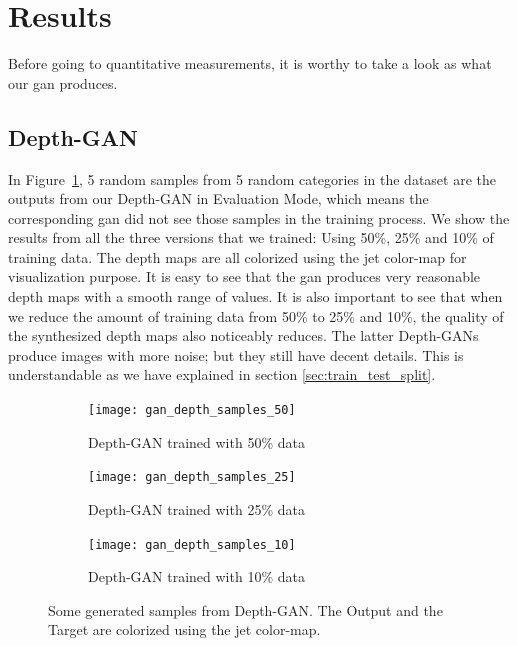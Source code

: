 \section{Results}
\label{sec:results}

Before going to quantitative measurements, it is worthy to take a look as what our
\acrshort{gan} produces. 

\subsection{Depth-GAN}
\label{sub:depth_gan}

In Figure~\ref{fig:gan_depth}, 5 random samples from 5 random categories in the dataset
are the outputs from our Depth-GAN in Evaluation Mode, which means the corresponding
\acrshort{gan} did not see those samples in the training process.  We show the results
from all the three versions that we trained: Using 50\%, 25\% and 10\% of training data.
The depth maps are all colorized using the jet color-map for visualization purpose. It is
easy to see that the \acrshort{gan} produces very reasonable depth maps with a smooth
range of values. It is also important to see that when we reduce the amount of training
data from 50\% to 25\% and 10\%, the quality of the synthesized depth maps also noticeably
reduces. The latter Depth-GANs produce images with more noise; but they still have decent
details. This is understandable as we have explained in section
\ref{sec:train_test_split}.

\begin{figure}[h!]
	\centering
	\begin{subfigure}{0.8\textwidth}
		\texttt{[image: gan\_depth\_samples\_50]}
		\caption{Depth-GAN trained with 50\% data} 
	\end{subfigure}
	\begin{subfigure}{0.49\textwidth}
		\texttt{[image: gan\_depth\_samples\_25]}
		\caption{Depth-GAN trained with 25\% data} 
	\end{subfigure}
	\begin{subfigure}{0.49\textwidth}
		\texttt{[image: gan\_depth\_samples\_10]}
		\caption{Depth-GAN trained with 10\% data} 
	\end{subfigure}
	
	\caption{Some generated samples from Depth-GAN. The Output and the Target are colorized using the jet color-map.}
	\label{fig:gan_depth}
\end{figure}

